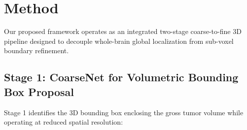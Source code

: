 \documentclass[12pt, a4paper]{article}
\begin{document}
\section{Method}

Our proposed framework operates as an integrated two-stage coarse-to-fine 3D pipeline designed to decouple whole-brain global localization from sub-voxel boundary refinement.

\subsection{Stage 1: CoarseNet for Volumetric Bounding Box Proposal}
Stage 1 identifies the 3D bounding box enclosing the gross tumor volume while operating at reduced spatial resolution:
\end{document}
